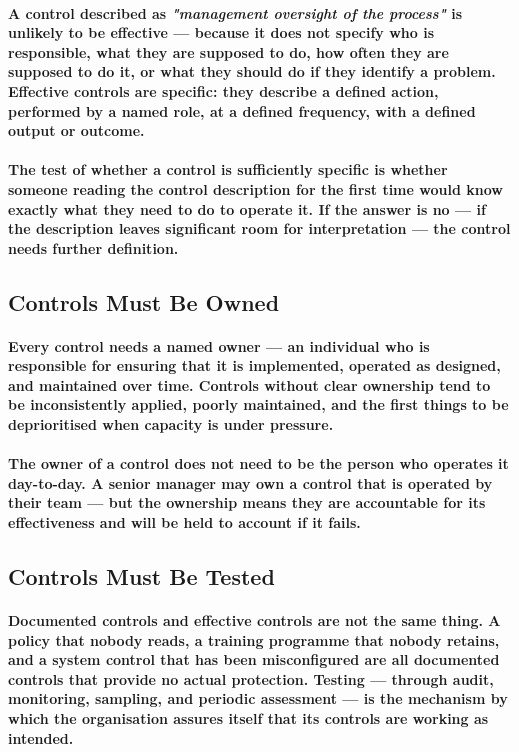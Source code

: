 \paragraph{A control described as \textit{"management oversight of the process"} is unlikely to be effective — because it does not specify who is responsible, what they are supposed to do, how often they are supposed to do it, or what they should do if they identify a problem. Effective controls are specific: they describe a defined action, performed by a named role, at a defined frequency, with a defined output or outcome.}
\paragraph{The test of whether a control is sufficiently specific is whether someone reading the control description for the first time would know exactly what they need to do to operate it. If the answer is no — if the description leaves significant room for interpretation — the control needs further definition.}

\subsection{Controls Must Be Owned}
\paragraph{Every control needs a named owner — an individual who is responsible for ensuring that it is implemented, operated as designed, and maintained over time. Controls without clear ownership tend to be inconsistently applied, poorly maintained, and the first things to be deprioritised when capacity is under pressure.}
\paragraph{The owner of a control does not need to be the person who operates it day-to-day. A senior manager may own a control that is operated by their team — but the ownership means they are accountable for its effectiveness and will be held to account if it fails.}

\subsection{Controls Must Be Tested}
\paragraph{Documented controls and effective controls are not the same thing. A policy that nobody reads, a training programme that nobody retains, and a system control that has been misconfigured are all documented controls that provide no actual protection. Testing — through audit, monitoring, sampling, and periodic assessment — is the mechanism by which the organisation assures itself that its controls are working as intended.}
